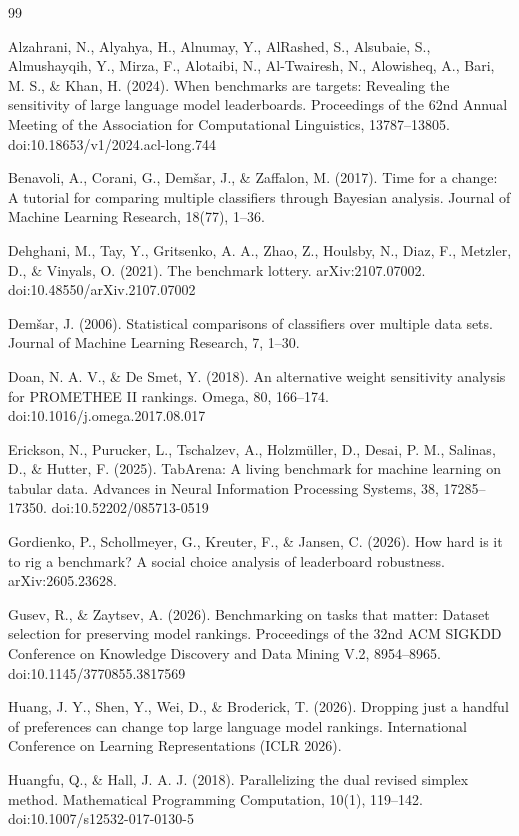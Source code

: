 \documentclass[11pt]{article}
\begin{document}
\begin{thebibliography}{99}

 Alzahrani, N., Alyahya, H., Alnumay, Y., AlRashed, S., Alsubaie, S., Almushayqih, Y., Mirza, F., Alotaibi, N., Al-Twairesh, N., Alowisheq, A., Bari, M. S., \& Khan, H. (2024). When benchmarks are targets: Revealing the sensitivity of large language model leaderboards. Proceedings of the 62nd Annual Meeting of the Association for Computational Linguistics, 13787–13805. doi:10.18653/v1/2024.acl-long.744

 Benavoli, A., Corani, G., Demšar, J., \& Zaffalon, M. (2017). Time for a change: A tutorial for comparing multiple classifiers through Bayesian analysis. Journal of Machine Learning Research, 18(77), 1–36.

 Dehghani, M., Tay, Y., Gritsenko, A. A., Zhao, Z., Houlsby, N., Diaz, F., Metzler, D., \& Vinyals, O. (2021). The benchmark lottery. arXiv:2107.07002. doi:10.48550/arXiv.2107.07002

 Demšar, J. (2006). Statistical comparisons of classifiers over multiple data sets. Journal of Machine Learning Research, 7, 1–30.

 Doan, N. A. V., \& De Smet, Y. (2018). An alternative weight sensitivity analysis for PROMETHEE II rankings. Omega, 80, 166–174. doi:10.1016/j.omega.2017.08.017

 Erickson, N., Purucker, L., Tschalzev, A., Holzmüller, D., Desai, P. M., Salinas, D., \& Hutter, F. (2025). TabArena: A living benchmark for machine learning on tabular data. Advances in Neural Information Processing Systems, 38, 17285–17350. doi:10.52202/085713-0519

 Gordienko, P., Schollmeyer, G., Kreuter, F., \& Jansen, C. (2026). How hard is it to rig a benchmark? A social choice analysis of leaderboard robustness. arXiv:2605.23628.

 Gusev, R., \& Zaytsev, A. (2026). Benchmarking on tasks that matter: Dataset selection for preserving model rankings. Proceedings of the 32nd ACM SIGKDD Conference on Knowledge Discovery and Data Mining V.2, 8954–8965. doi:10.1145/3770855.3817569

 Huang, J. Y., Shen, Y., Wei, D., \& Broderick, T. (2026). Dropping just a handful of preferences can change top large language model rankings. International Conference on Learning Representations (ICLR 2026).

 Huangfu, Q., \& Hall, J. A. J. (2018). Parallelizing the dual revised simplex method. Mathematical Programming Computation, 10(1), 119–142. doi:10.1007/s12532-017-0130-5


\end{thebibliography}
\end{document}
